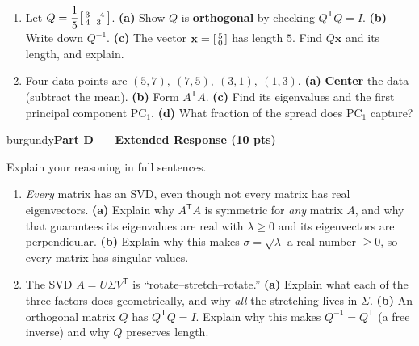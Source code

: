 \documentclass[10pt]{article}
\newcommand{\xx}{\mathbf{x}}
\newcommand{\vv}{\mathbf{v}}
\newcommand{\uu}{\mathbf{u}}
\newcommand{\T}{^{\mathsf T}}
\newcommand{\parthead}[1]{%
  \vspace{6pt}\noindent
  \begin{headlinebox}{burgundy}{\color{white}\bfseries #1}\end{headlinebox}%
  \vspace{4pt}}
\begin{document}
\begin{enumerate}[leftmargin=1.9em, itemsep=12pt]
        with $\uu_1=\vv_1=\tfrac{1}{\sqrt2}\begin{bsmallmatrix}1\\1\end{bsmallmatrix}$.
        \textbf{(a)} Build the best rank-one approximation $A_1=\sigma_1\uu_1\vv_1\T$.
        \textbf{(b)} What fraction of the \textbf{energy} does $A_1$ keep?
        \vspace{2.8cm}
  \item Let $Q=\dfrac15\begin{bsmallmatrix}3&-4\\4&3\end{bsmallmatrix}$.
        \textbf{(a)} Show $Q$ is \textbf{orthogonal} by checking $Q\T Q=I$.
        \textbf{(b)} Write down $Q^{-1}$.
        \textbf{(c)} The vector $\xx=\begin{bsmallmatrix}5\\0\end{bsmallmatrix}$ has length $5$. Find $Q\xx$ and its length, and explain.
        \vspace{2.8cm}
  \item Four data points are $(5,7),\ (7,5),\ (3,1),\ (1,3)$.
        \textbf{(a)} \textbf{Center} the data (subtract the mean). \textbf{(b)} Form $A\T A$.
        \textbf{(c)} Find its eigenvalues and the first principal component $\mathrm{PC}_1$.
        \textbf{(d)} What fraction of the spread does $\mathrm{PC}_1$ capture?
        \vspace{3.0cm}
\end{enumerate}

\parthead{Part D --- Extended Response (10 pts)}
Explain your reasoning in full sentences.

\begin{enumerate}[leftmargin=1.9em, itemsep=16pt]
  \item \emph{Every} matrix has an SVD, even though not every matrix has real eigenvectors.
        \textbf{(a)} Explain why $A\T A$ is symmetric for \emph{any} matrix $A$, and why that guarantees its
        eigenvalues are real with $\lambda\ge0$ and its eigenvectors are perpendicular.
        \textbf{(b)} Explain why this makes $\sigma=\sqrt{\lambda}$ a real number $\ge0$, so every matrix has singular values.
        \vspace{3.0cm}
  \item The SVD $A=U\Sigma V\T$ is ``rotate--stretch--rotate.''
        \textbf{(a)} Explain what each of the three factors does geometrically, and why \emph{all} the stretching lives in $\Sigma$.
        \textbf{(b)} An orthogonal matrix $Q$ has $Q\T Q=I$. Explain why this makes $Q^{-1}=Q\T$ (a free inverse) and why $Q$ preserves length.
        \vspace{2.8cm}
\end{enumerate}
\end{document}
